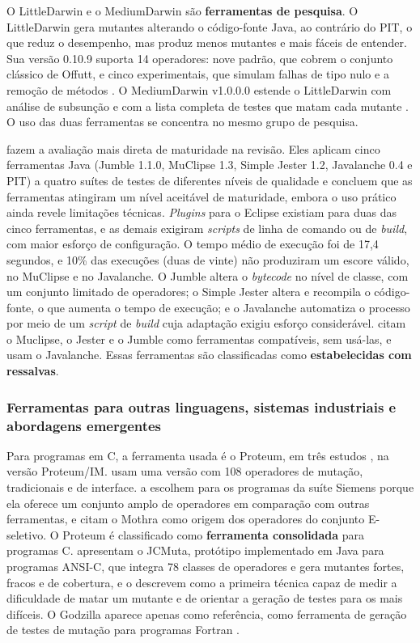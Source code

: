 O LittleDarwin e o MediumDarwin são \textbf{ferramentas de pesquisa}. O LittleDarwin gera mutantes alterando o código-fonte Java, ao contrário do PIT, o que reduz o desempenho, mas produz menos mutantes e mais fáceis de entender. Sua versão 0.10.9 suporta 14 operadores: nove padrão, que cobrem o conjunto clássico de Offutt, e cinco experimentais, que simulam falhas de tipo nulo e a remoção de métodos \cite{ashong2025}. O MediumDarwin v1.0.0.0 estende o LittleDarwin com análise de subsunção e com a lista completa de testes que matam cada mutante \cite{ashong2026}. O uso das duas ferramentas se concentra no mesmo grupo de pesquisa.

 fazem a avaliação mais direta de maturidade na revisão. Eles aplicam cinco ferramentas Java (Jumble 1.1.0, MuClipse 1.3, Simple Jester 1.2, Javalanche 0.4 e PIT) a quatro suítes de testes de diferentes níveis de qualidade e concluem que as ferramentas atingiram um nível aceitável de maturidade, embora o uso prático ainda revele limitações técnicas. \textit{Plugins} para o Eclipse existiam para duas das cinco ferramentas, e as demais exigiram \textit{scripts} de linha de comando ou de \textit{build}, com maior esforço de configuração. O tempo médio de execução foi de 17,4 segundos, e 10\% das execuções (duas de vinte) não produziram um escore válido, no MuClipse e no Javalanche. O Jumble altera o \textit{bytecode} no nível de classe, com um conjunto limitado de operadores; o Simple Jester altera e recompila o código-fonte, o que aumenta o tempo de execução; e o Javalanche automatiza o processo por meio de um \textit{script} de \textit{build} cuja adaptação exigiu esforço considerável.  citam o Muclipse, o Jester e o Jumble como ferramentas compatíveis, sem usá-las, e  usam o Javalanche. Essas ferramentas são classificadas como \textbf{estabelecidas com ressalvas}.

\subsubsection{Ferramentas para outras linguagens, sistemas industriais e abordagens emergentes}

Para programas em C, a ferramenta usada é o Proteum, em três estudos \cite{zhang2010, kurtz2016, kuroishi2020}, na versão Proteum/IM.  usam uma versão com 108 operadores de mutação, tradicionais e de interface.  a escolhem para os programas da suíte Siemens porque ela oferece um conjunto amplo de operadores em comparação com outras ferramentas, e citam o Mothra como origem dos operadores do conjunto E-seletivo. O Proteum é classificado como \textbf{ferramenta consolidada} para programas C.  apresentam o JCMuta, protótipo implementado em Java para programas ANSI-C, que integra 78 classes de operadores e gera mutantes fortes, fracos e de cobertura, e o descrevem como a primeira técnica capaz de medir a dificuldade de matar um mutante e de orientar a geração de testes para os mais difíceis. O Godzilla aparece apenas como referência, como ferramenta de geração de testes de mutação para programas Fortran \cite{kintis2010}.

